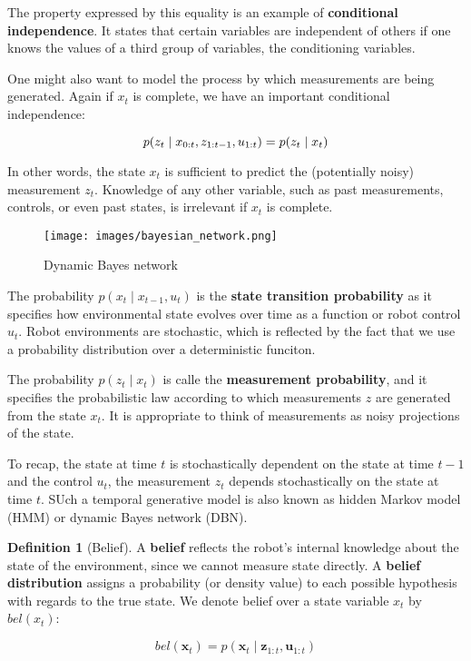 \documentclass[14pt,letterpaper]{article}
\theoremstyle{definition}
\newtheorem{definition}{Definition}[section]
\newcommand{\state}{\bm{x}}
\newcommand{\obs}{\bm{z}}
\newcommand{\control}{\bm{u}}
\begin{document}
The property expressed by this equality is an example of \textbf{conditional independence}.
It states that certain variables are independent of others if one knows the values of a third group of variables, the conditioning variables.

One might also want to model the process by which measurements are being generated.
Again if $x_t$ is complete, we have an important conditional independence:

\begin{equation}
  p(z_t \mid x_{0:t}, z_{1:t-1}, u_{1:t}) = p(z_t \mid x_{t}) \\
\end{equation}

In other words, the state $x_t$ is sufficient to predict the (potentially noisy) measurement $z_t$.
Knowledge of any other variable, such as past measurements, controls, or even past states, is irrelevant if $x_t$ is complete.

\begin{figure}[H]
  \centering
	\texttt{[image: images/bayesian\_network.png]}
	\caption{Dynamic Bayes network}
\end{figure}

The probability $p(x_t \mid x_{t-1}, u_t)$ is the \textbf{state transition probability} as it specifies how environmental state evolves over time as a function or robot control $u_t$.
Robot environments are stochastic, which is reflected by the fact that we use a probability distribution over a deterministic funciton.

\vspace{2mm}

The probability $p(z_t \mid x_t)$ is calle the \textbf{measurement probability}, and it specifies the probabilistic law according to which measurements $z$ are generated from the state $x_t$.
It is appropriate to think of measurements as noisy projections of the state.

\vspace{2mm}

To recap, the state at time $t$ is stochastically dependent on the state at time $t-1$ and the control $u_t$, the measurement $z_t$ depends stochastically on the state at time $t$.
SUch a temporal generative model is also known as hidden Markov model (HMM) or dynamic Bayes network (DBN).

\vspace{2mm}

\begin{definition}[Belief]
  A \textbf{belief} reflects the robot's internal knowledge about the state of the environment, since we cannot measure state directly.
  A \textbf{belief distribution} assigns a probability (or density value) to each possible hypothesis with regards to the true state.
  We denote belief over a state variable $x_t$ by $bel(x_t)$:

\begin{equation}
    bel(\state_t) = p(\state_t \mid \obs_{1:t}, \control_{1:t})
\end{equation}
\end{definition}
\end{document}

